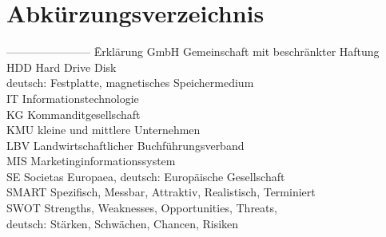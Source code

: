 \documentclass[a4paper]{scrartcl}
\begin{document}
\thispagestyle{empty}




\newpage


\setcounter{page}{2}

\tableofcontents



\newpage

\section*{Abkürzungsverzeichnis}


\begin{tabbing}
	----------------------- \= Erklärung \kill
	GmbH \> Gemeinschaft mit beschränkter Haftung \\
	HDD \> Hard Drive Disk \\
	\> deutsch: Festplatte, magnetisches Speichermedium  \\
	IT \> Informationstechnologie \\
	KG \> Kommanditgesellschaft \\
	KMU \> kleine und mittlere Unternehmen \\ 
	LBV \> Landwirtschaftlicher Buchführungsverband \\
	MIS \> Marketinginformationssystem \\
	SE \> Societas Europaea, deutsch: Europäische Gesellschaft \\
	SMART \> Spezifisch, Messbar, Attraktiv, Realistisch, Terminiert \\
	SWOT \> Strengths, Weaknesses, Opportunities, Threats, \\
	\> deutsch: Stärken, Schwächen, Chancen, Risiken \\	
\end{tabbing}


\newpage

\listoffigures


\newpage
\end{document}
